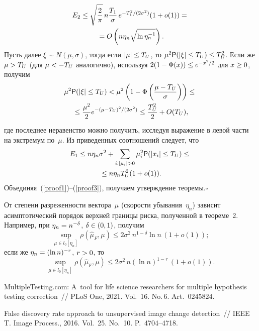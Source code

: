 \begin{multicols}{2}
\columnbreak

\noindent
\begin{multline}
\label{proof2}
E_2 \leq \sqrt{\displaystyle\frac{\displaystyle 2\mathstrut}{\displaystyle \pi\mathstrut}} \, n \displaystyle\frac{\displaystyle T_1\mathstrut}{\displaystyle \sigma\mathstrut}\, e^{-T_1^2/(2\sigma^2)}(1 + o(1)) = {}\\
{}=
O\left(n \eta_n \sqrt{\ln \eta_n^{-1}}\right). 
\end{multline}
Пусть далее $\xi \sim N(\mu,\sigma)$, тогда если $|\mu| \hm\leq T_U$, то $\mu^2 \p 
(|\xi|\hm\leq T_U) \hm\leq T_U^2$.
Если же $\mu \hm> T_U$ (для $\mu\hm < -T_U$ аналогично), используя $2(1\hm-\Phi(x))\hm \leq 
e^{-x^2/2}$ для $x\hm\geq 0$, получим
\begin{multline*}
\mu^2 {\sf P} (|\xi|\leq T_U) < \mu^2 \left(1-\Phi\left(\displaystyle\frac{\displaystyle \mu- T_U\mathstrut}{\displaystyle \sigma\mathstrut}\right)\right) \leq{}\\
{}\leq \displaystyle\frac{\displaystyle \mu^2\mathstrut}{\displaystyle 2\mathstrut} e^{-(\mu-T_U)^2/(2\sigma^2)}  \leq \displaystyle\frac{\displaystyle T_U^2\mathstrut}{\displaystyle 2\mathstrut}+O(T_U),
\end{multline*}
где последнее неравенство можно получить, исследуя выражение в левой части на 
экстремум по~$\mu$.
Из приведенных соотношений следует, что
\begin{multline}
\label{proof3}
E_1 \leq n\eta_n \sigma^2 + \sum\limits_{i : |\mu_i| > 0} \mu_i^2 {\sf P} (|x_i|\leq 
T_U)\leq{}\\
{}\leq  n \eta_n T_U^2 (1+o(1)).
\end{multline}
Объединяя~(\ref{proof1})--(\ref{proof3}), получаем утверждение тео\-ре\-мы.\hfill$\square$

\smallskip

От степени разреженности вектора~$\mu$ (ско\-рости убывания~$\eta_n$) зависит 
асимптотический порядок верхней границы риска, полученной в тео\-ре\-ме~2. Например, при $\eta_n\hm = n^{-\delta}$, $\delta\hm\in(0,1)$, получим
$$
\sup\limits_{\mu\in l_0[\eta_n]}\rho(\hat{\mu}_F, \mu)  \leq 2\sigma^2 \, 
n^{1-\delta} \ln n \, (1+o(1));
$$
если же $\eta_n\hm = (\ln n)^{-r}$, $r\hm>0$, то
$$
\sup\limits_{\mu\in l_0[\eta_n]}\rho(\hat{\mu}_F, \mu)  \leq 2\sigma^2 \, n 
(\ln n)^{1-r} \, (1+o(1)).
$$


{\small\frenchspacing
 {%
 \begin{thebibliography}{9}
MultipleTesting.com: A~tool for life science researchers for multiple hypothesis 
testing correction~// PLoS One, 2021. Vol.~16. No.\,6. Art.~0245824.

False discovery rate approach to unsupervised image change detection~// IEEE 
T. Image Process., 2016. Vol.~25. No.~10. P.~4704--4718.


\end{thebibliography}}}
\end{multicols}
